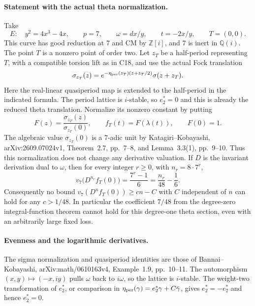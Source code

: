 \documentclass[11pt]{article}
\newcommand{\Q}{\mathbb Q}\newcommand{\C}{\mathbb C}\newcommand{\Z}{\mathbb Z}\newcommand{\R}{\mathbb R}\newcommand{\A}{\mathbb A}\newcommand{\OO}{\mathcal O}
\theoremstyle{definition}\newtheorem{definition}[theorem]{Definition}\newtheorem{remark}[theorem]{Remark}
\begin{document}
\paragraph{Statement with the actual theta normalization.}
Take
\[
 E:\quad y^2=4x^3-4x,\qquad p=7,\qquad
 \omega=dx/y,\qquad t=-2x/y,
 \qquad T=(0,0).
\]
This curve has good reduction at 7 and CM by $\Z[i]$, and 7 is
inert in $\Q(i)$.  The point $T$ is a nonzero point of order
two.  Let $z_T$ be a half-period representing $T$, with a
compatible torsion lift as in C18, and use the actual Fock
translation
\[
 \sigma_{z_T}(z)=
 e^{-\eta_{\rm per}(z_T)(z+z_T/2)}\sigma(z+z_T).
\]
Here the real-linear quasiperiod map is extended to the
half-period in the indicated formula.  The period lattice is
$i$-stable, so $e_2^*=0$ and this is already the reduced theta
translation.  Normalize its nonzero constant by putting
\[
 F(z)=\frac{\sigma_{z_T}(z)}{\sigma_{z_T}(0)},\qquad
 f_T(t)=F(\lambda(t)),\qquad F(0)=1.
\]
The algebraic value $\sigma_{z_T}(0)$ is a 7-adic unit by
Katagiri--Kobayashi, arXiv:2609.07024v1,
Theorem~2.7, pp.~7--8, and Lemma~3.3(1), pp.~9--10.
Thus this normalization does not change any derivative valuation.
If $D$ is the invariant derivation dual to $\omega$, then for
every integer $r\geq0$, with $n_r=8\cdot7^r$,
\begin{equation}\label{C22-exact}
 v_7\bigl(D^{n_r}f_T(0)\bigr)
      =\frac{7^r-1}{6}
      =\frac{n_r}{48}-\frac16.
\end{equation}
Consequently no bound
$v_7(D^nf_T(0))\geq c n-C$ with $C$ independent of $n$
can hold for any $c>1/48$.
In particular the coefficient $7/48$ from the degree-zero
integral-function theorem cannot hold for this degree-one
theta section, even with an arbitrarily large fixed loss.

\paragraph{Evenness and the logarithmic derivatives.}
The sigma normalization and quasiperiod identities are those of
Bannai--Kobayashi, arXiv:math/0610163v4,
Example~1.9, pp.~10--11.
The automorphism $(x,y)\mapsto(-x,iy)$ pulls $\omega$ back to
$i\omega$, so the lattice is $i$-stable.  The weight-two
transformation of $e_2^*$, or comparison in
$\eta_{\rm per}(\gamma)=e_2^*\gamma+C\bar\gamma$, gives
$e_2^*=-e_2^*$ and hence $e_2^*=0$.
\end{document}
